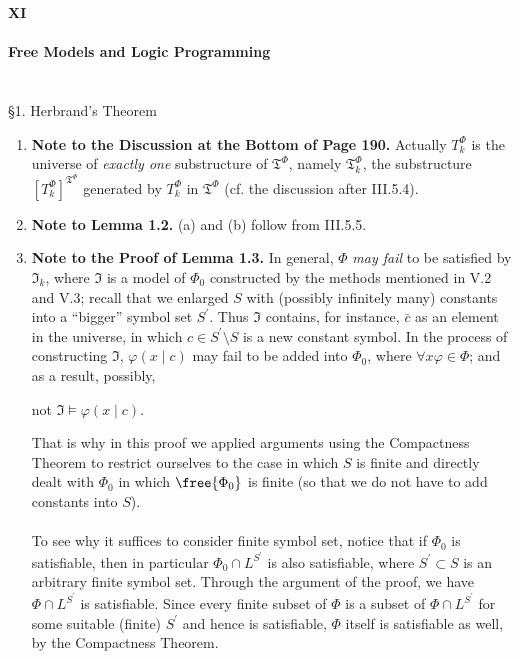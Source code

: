 {\LARGE \bfseries XI \\ \\ Free Models and Logic Programming}
\\
\\
\\
{\large \S1. Herbrand's Theorem}
\begin{enumerate}[1.]
\item \textbf{Note to the Discussion at the Bottom of Page 190.} Actually $T_k^\Phi$ is the universe of \emph{exactly one} substructure of $\mathfrak{T}^\Phi$, namely $\mathfrak{T}_k^\Phi$, the substructure $[T_k^\Phi]^{\mathfrak{T}^\Phi}$ generated by $T_k^\Phi$ in $\mathfrak{T}^\Phi$ (cf. the discussion after III.5.4).
%
\item \textbf{Note to Lemma 1.2.} (a) and (b) follow from III.5.5.
%
\item \textbf{Note to the Proof of Lemma 1.3.} In general, $\Phi$ \emph{may fail} to be satisfied by $\mathfrak{I}_k$, where $\mathfrak{I}$ is a model of $\Phi_0$ constructed by the methods mentioned in V.2 and V.3; recall that we enlarged $S$ with (possibly infinitely many) constants into a ``bigger'' symbol set $S^\prime$. Thus $\mathfrak{I}$ contains, for instance, $\bar{c}$ as an element in the universe, in which $c \in S^\prime \setminus S$ is a new constant symbol. In the process of constructing $\mathfrak{I}$, $\varphi (x \mid c)$ may fail to be added into $\Phi_0$, where $\forall x \varphi \in \Phi$; and as a result, possibly,
\begin{center}
not $\mathfrak{I} \models \varphi (x \mid c)$.
\end{center}
That is why in this proof we applied arguments using the Compactness Theorem to restrict ourselves to the case in which $S$ is finite and directly dealt with $\Phi_0$ in which $\free{\Phi_0}$ is finite (so that we do not have to add constants into $S$).\\
\ \\
To see why it suffices to consider finite symbol set, notice that if $\Phi_0$ is satisfiable, then in particular $\Phi_0 \cap L^{S^\prime}$ is also satisfiable, where $S^\prime \subset S$ is an arbitrary finite symbol set. Through the argument of the proof, we have $\Phi \cap L^{S^\prime}$ is satisfiable. Since every finite subset of $\Phi$ is a subset of $\Phi \cap L^{S^\prime}$ for some suitable (finite) $S^\prime$ and hence is satisfiable, $\Phi$ itself is satisfiable as well, by the Compactness Theorem.\\

\end{enumerate}
